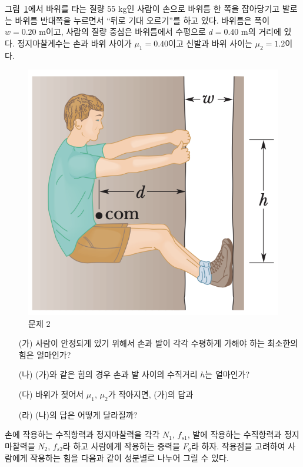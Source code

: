 \documentclass[floatfix,nofootinbib,superscriptaddress,fleqn]{revtex4-2}
\begin{document}
\vspace{0.5cm}

그림~\ref{fig:2}에서 바위를 타는 질량 55 kg인 사람이 손으로 바위틈 한
쪽을 잡아당기고 발로는 바위틈 반대쪽을 누르면서 ``뒤로 기대 오르기''를
하고 있다. 바위틈은 폭이 $w=0.20$ m이고, 사람의 질량 중심은 바위틈에서
수평으로 $d=0.40$ m의 거리에 있다. 정지마찰계수는 손과 바위 사이가
$\mu_1=0.40$이고 신발과 바위 사이는 $\mu_2=1.2$이다.  
\begin{figure}[ht]
  \centering
\includegraphics[scale=0.6]{Qfig15-2-20220502.png}
  \caption{문제 2}
  \label{fig:2}
\end{figure}
\begin{itemize}
\item[(가)] 사람이 안정되게 있기 위해서 손과 발이 각각 수평하게 가해야
  하는 최소한의 힘은 얼마인가?
\item[(나)] (가)와 같은 힘의 경우 손과 발 사이의 수직거리 $h$는
  얼마인가?
\item[(다)]  바위가 젖어서 $\mu_1$, $\mu_2$가 작아지면, (가)의
  답과
\item[(라)] (나)의 답은 어떻게 달라질까?
\end{itemize}

 손에 작용하는 수직항력과 정지마찰력을 각각 
$N_1$, $f_{s1}$,
발에 작용하는 수직항력과 정지마찰력을 $N_2$, $f_{s2}$라 하고 
사람에게 작용하는 중력을 
$F_g$라 하자. 작용점을 고려하여 사람에게 작용하는 힘을 
다음과 같이 성분별로 나누어 그릴 수 있다.
\end{document}
